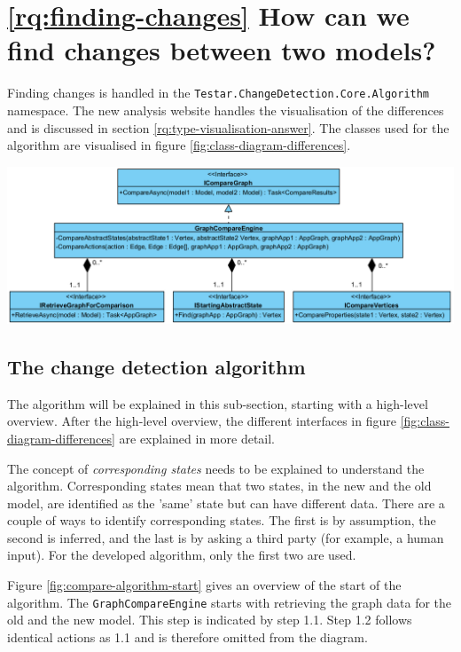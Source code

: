 \section{\ref{rq:finding-changes} How can we find changes between two models?} \label{sec:finding-changes}


Finding changes is handled in the \verb|Testar.ChangeDetection.Core.Algorithm| namespace. The new analysis website handles the visualisation of the differences and is discussed in section \ref{rq:type-visualisation-answer}. The classes used for the algorithm are visualised in figure \ref{fig:class-diagram-differences}. 

\begingroup
\captionsetup{type=figure}
\includegraphics[scale=0.65]{images/4-UML-Differences.png}
\label{fig:class-diagram-differences}
\endgroup

\subsection{The change detection algorithm} \label{sec:change-detection-algorithm}
The algorithm will be explained in this sub-section, starting with a high-level overview. After the high-level overview, the different interfaces in figure \ref{fig:class-diagram-differences} are explained in more detail.

The concept of \textit{corresponding states} needs to be explained to understand the algorithm. Corresponding states mean that two states, in the new and the old model, are identified as the 'same' state but can have different data. There are a couple of ways to identify corresponding states. The first is by assumption, the second is inferred, and the last is by asking a third party (for example, a human input). For the developed algorithm, only the first two are used. 

Figure \ref{fig:compare-algorithm-start} gives an overview of the start of the algorithm. The \verb|GraphCompareEngine| starts with retrieving the graph data for the old and the new model. This step is indicated by step 1.1. Step 1.2 follows identical actions as 1.1 and is therefore omitted from the diagram.
\newpage

